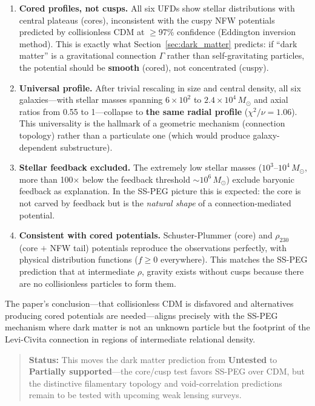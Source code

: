\begin{enumerate}
\item \textbf{Cored profiles, not cusps.} All six UFDs show stellar distributions with central plateaus (cores), inconsistent with the cuspy NFW potentials predicted by collisionless CDM at $\geq$97\% confidence (Eddington inversion method). This is exactly what Section~\ref{sec:dark_matter} predicts: if ``dark matter'' is a gravitational connection $\Gamma$ rather than self-gravitating particles, the potential should be \textbf{smooth} (cored), not concentrated (cuspy).

\item \textbf{Universal profile.} After trivial rescaling in size and central density, all six galaxies---with stellar masses spanning $6 \times 10^2$ to $2.4 \times 10^4\, M_\odot$ and axial ratios from 0.55 to 1---collapse to \textbf{the same radial profile} ($\chi^2/\nu = 1.06$). This universality is the hallmark of a geometric mechanism (connection topology) rather than a particulate one (which would produce galaxy-dependent substructure).

\item \textbf{Stellar feedback excluded.} The extremely low stellar masses ($10^3$--$10^4\, M_\odot$, more than 100$\times$ below the feedback threshold $\sim 10^6\, M_\odot$) exclude baryonic feedback as explanation. In the SS-PEG picture this is expected: the core is not carved by feedback but is the \textit{natural shape} of a connection-mediated potential.

\item \textbf{Consistent with cored potentials.} Schuster-Plummer (core) and $\rho_{230}$ (core $+$ NFW tail) potentials reproduce the observations perfectly, with physical distribution functions ($f \geq 0$ everywhere). This matches the SS-PEG prediction that at intermediate $\rho$, gravity exists without cusps because there are no collisionless particles to form them.
\end{enumerate}

The paper's conclusion---that collisionless CDM is disfavored and alternatives producing cored potentials are needed---aligns precisely with the SS-PEG mechanism where dark matter is not an unknown particle but the footprint of the Levi-Civita connection in regions of intermediate relational density.

\begin{quote}
\textbf{Status:} This moves the dark matter prediction from \textbf{Untested} to \textbf{Partially supported}---the core/cusp test favors SS-PEG over CDM, but the distinctive filamentary topology and void-correlation predictions remain to be tested with upcoming weak lensing surveys.
\end{quote}

